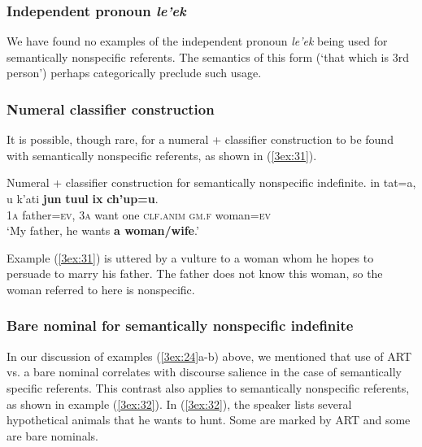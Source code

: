 \documentclass[output=paper]{langsci/langscibook}
\begin{document}
\subsubsection{Independent pronoun {\emph{le'ek}} }\label{3sec:353}

We have found no examples of the independent pronoun {\emph{le'ek}} being used for semantically nonspecific referents. The semantics of this form (`that which is 3rd person') perhaps categorically preclude such usage.

\subsubsection{Numeral classifier construction}\label{3sec:354}

It is possible, though rare, for a numeral + classifier construction to be found with semantically nonspecific referents, as shown in (\ref{3ex:31}).

\begin{exe}
\ex\label{3ex:31}
Numeral + classifier construction for semantically nonspecific indefinite. 
\exi{}
\gll	in 		tat=a, 			u 		k'ati 		{\textbf{jun}} 	{\textbf{tuul}} 		{\textbf{ix}} 		{\textbf{ch'up=u}}.  \\
	{\textsc{1a}}	father={\textsc{ev}},	{\textsc{3a}}	want		one		{\textsc{clf.anim}}	{\textsc{gm.f}}		woman={\textsc{ev}} \\
\glt 	`My father, he wants {\textbf{a woman/wife}}.'
\end{exe}

Example (\ref{3ex:31}) is uttered by a vulture to a woman whom he hopes to persuade to marry his father.  The father does not know this woman, so the woman referred to here is nonspecific.

\subsubsection{Bare nominal for semantically nonspecific indefinite}\label{3sec:355}

In our discussion of examples (\ref{3ex:24}a-b) above, we mentioned that use of ART vs. a bare nominal correlates with discourse salience in the case of semantically specific referents.  This contrast also applies to semantically nonspecific referents, as shown in example (\ref{3ex:32}). In (\ref{3ex:32}), the speaker lists several hypothetical animals that he wants to hunt.  Some are marked by ART and some are bare nominals.
\end{document}
